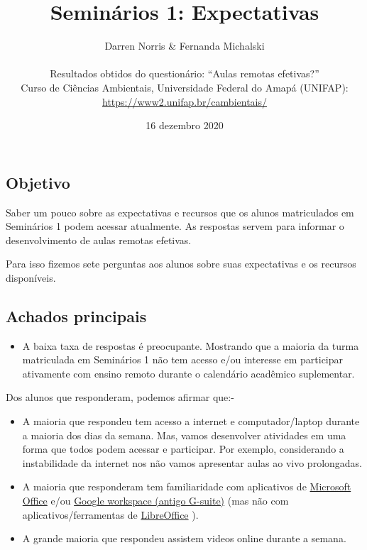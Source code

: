 \documentclass[
]{article}
\title{Seminários 1: Expectativas}
\subtitle{Darren Norris \& Fernanda Michalski\\
~\\
Resultados obtidos do questionário: ``Aulas remotas efetivas?''\\
Curso de Ciências Ambientais, Universidade Federal do Amapá (UNIFAP):
\url{https://www2.unifap.br/cambientais/}}
\author{}
\date{\vspace{-2.5em}16 dezembro 2020}
\providecommand{\tightlist}{%
  \setlength{\itemsep}{0pt}\setlength{\parskip}{0pt}}
\begin{document}
\maketitle

\hypertarget{objetivo}{%
\subsection{Objetivo}\label{objetivo}}

Saber um pouco sobre as expectativas e recursos que os alunos
matriculados em Seminários 1 podem acessar atualmente. As respostas
servem para informar o desenvolvimento de aulas remotas efetivas.

Para isso fizemos sete perguntas aos alunos sobre suas expectativas e os
recursos disponíveis.

\hypertarget{achados-principais}{%
\subsection{Achados principais}\label{achados-principais}}

\begin{itemize}
\tightlist
\item
  A baixa taxa de respostas é preocupante. Mostrando que a maioria da
  turma matriculada em Seminários 1 não tem acesso e/ou interesse em
  participar ativamente com ensino remoto durante o calendário acadêmico
  suplementar.
\end{itemize}

Dos alunos que responderam, podemos afirmar que:-

\begin{itemize}
\item
  A maioria que respondeu tem acesso a internet e computador/laptop
  durante a maioria dos dias da semana. Mas, vamos desenvolver
  atividades em uma forma que todos podem acessar e participar. Por
  exemplo, considerando a instabilidade da internet nos não vamos
  apresentar aulas ao vivo prolongadas.
\item
  A maioria que responderam tem familiaridade com aplicativos de
  \href{https://www.microsoft.com/pt-br/microsoft-365}{Microsoft Office}
  e/ou \href{https://workspace.google.com/intl/pt-BR/}{Google workspace
  (antigo G-suite)} (mas não com aplicativos/ferramentas de
  \href{https://pt-br.libreoffice.org/}{LibreOffice} ).
\item
  A grande maioria que respondeu assistem videos online durante a
  semana.
\end{itemize}
\end{document}
